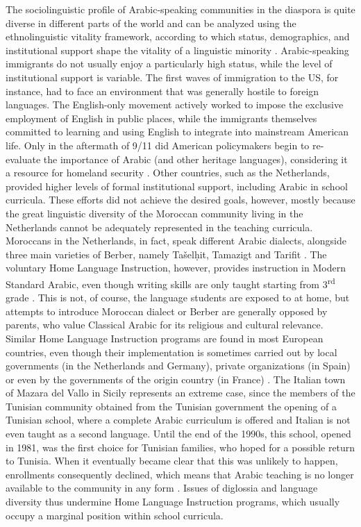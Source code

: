 \documentclass[output=paper]{langsci/langscibook}
\begin{document}
The sociolinguistic profile of Arabic-speaking communities in the diaspora is quite diverse in different parts of the world and can be analyzed using the ethnolinguistic vitality framework, according to which status, demographics, and institutional support shape the vitality of a linguistic minority \citep{GilesTaylor1977,Ehala2015}. Arabic-speaking immigrants do not usually enjoy a particularly high status, while the level of institutional support is variable. The first waves of immigration to the US, for instance, had to face an environment that was generally hostile to foreign languages. The English-only movement actively worked to impose the exclusive employment of English in public places, while the immigrants themselves committed to learning and using English to integrate into mainstream American life. Only in the aftermath of 9/11 did American policymakers begin to re-evaluate the importance of Arabic (and other heritage languages), considering it a resource for homeland security \citep[319--320]{Albirini2016}. Other countries, such as the Netherlands, provided higher levels of formal institutional support, including Arabic in school curricula. These efforts did not achieve the desired goals, however, mostly because the great linguistic diversity of the Moroccan community living in the Netherlands cannot be adequately represented in the teaching curricula. Moroccans in the Netherlands, in fact, speak different Arabic dialects, alongside three main varieties of Berber, namely Tašelḥit, Tamazigt and Tarifit \citep[160--161]{ExtraDeRuiter1994}. The voluntary Home Language Instruction, however, provides instruction in Modern Standard Arabic, even though writing skills are only taught starting from 3\textsuperscript{rd} grade \citep[163--165]{ExtraDeRuiter1994}. This is not, of course, the language students are exposed to at home, but attempts to introduce Moroccan dialect or Berber are generally opposed by parents, who value Classical Arabic for its religious and cultural relevance. Similar Home Language Instruction programs are found in most European countries, even though their implementation is sometimes carried out by local governments (in the Netherlands and Germany), private organizations (in Spain) or even by the governments of the origin country (in France) \citep[264--265]{BoumansdeRuiter2002}. The Italian town of Mazara del Vallo in Sicily represents an extreme case, since the members of the Tunisian community obtained from the Tunisian government the opening of a Tunisian school, where a complete Arabic curriculum is offered and Italian is not even taught as a second language. Until the end of the 1990s, this school, opened in 1981, was the first choice for Tunisian families, who hoped for a possible return to Tunisia. When it eventually became clear that this was unlikely to happen, enrollments consequently declined, which means that Arabic teaching is no longer available to the community in any form \citep[73--77]{Danna2017book}. Issues of diglossia and language diversity thus undermine Home Language Instruction programs, which usually occupy a marginal position within school curricula.
\end{document}
